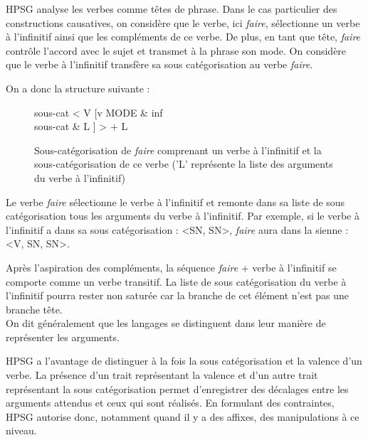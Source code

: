 HPSG  analyse les verbes comme têtes de phrase.
Dans le cas particulier des constructions causatives, on considère que le verbe, ici \emph{faire}, sélectionne un verbe à l'infinitif ainsi que les compléments de ce verbe.
De plus, en tant que tête, \emph{faire} contrôle l'accord avec le sujet et transmet à la phrase son mode.
On considère que le verbe à l'infinitif transfère sa sous catégorisation au verbe \emph{faire}.

On a donc la structure suivante :

\begin{figure}[ht]
\centering
\begin{minipage}{.8\textwidth}
\centering
\begin{avm}
			sous-cat  < V [{v}
                                       MODE & inf\\
                                       sous-cat & L
                                      ] > + L
\end{avm}
\caption{Sous-catégorisation de \emph{faire} comprenant un verbe à l'infinitif et la sous-catégorisation de ce verbe ('L' représente la liste des arguments du verbe à l'infinitif)}
\end{minipage}
\end{figure}


Le verbe \emph{faire} sélectionne le verbe à l'infinitif et remonte dans sa liste de sous catégorisation tous les arguments du verbe à l'infinitif.
Par exemple, si le verbe à l'infinitif a dans sa sous catégorisation : <SN, SN>, \emph{faire} aura dans la sienne : <V, SN, SN>.

Après l'aspiration des compléments, la séquence \emph{faire} + verbe à l'infinitif se comporte comme un verbe transitif.
La liste de sous catégorisation du verbe à l'infinitif pourra rester non saturée car la branche de cet élément n'est pas une branche tête.\\

On dit généralement que les langages se distinguent dans leur manière de représenter les arguments.

HPSG a l'avantage de distinguer à la fois la sous catégorisation et la valence d'un verbe.
La présence d'un trait représentant la valence et d'un autre trait représentant la sous catégorisation permet d'enregistrer des décalages entre les arguments attendus et ceux qui sont réalisés.
En formulant des contraintes, HPSG autorise donc, notamment quand il y a des affixes, des manipulations à ce niveau.\\

